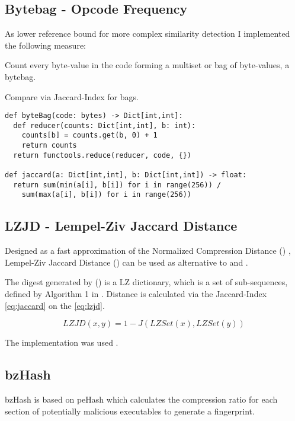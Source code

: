 \documentclass[../main.tex]{subfiles}
\begin{document}
\subsection{Bytebag - Opcode Frequency}
As lower reference bound for more complex similarity detection I implemented the following measure:

\begin{ol}
  \item Count every byte-value in the code forming a multiset or bag of byte-values, a bytebag.
  \item Compare via Jaccard-Index for bags.
\end{ol}

\begin{lstlisting}[style=pymd]
def byteBag(code: bytes) -> Dict[int,int]:
  def reducer(counts: Dict[int,int], b: int):
    counts[b] = counts.get(b, 0) + 1
    return counts
  return functools.reduce(reducer, code, {})

def jaccard(a: Dict[int,int], b: Dict[int,int]) -> float:
  return sum(min(a[i], b[i]) for i in range(256)) /
    sum(max(a[i], b[i]) for i in range(256))
\end{lstlisting}

\subsection{LZJD - Lempel-Ziv Jaccard Distance}
Designed as a fast approximation of the Normalized Compression Distance () \cite{raff2017alternative}, Lempel-Ziv Jaccard Distance () can be used as alternative to  and  \cite{raff2018lempel}.

The digest generated by  () is a LZ dictionary, which is a set of sub-sequences, defined by Algorithm 1 in \cite{raff2017alternative}. Distance is calculated via the Jaccard-Index \eqref{eq:jaccard} on the  \eqref{eq:lzjd}.

\begin{equation}
  LZJD(x,y) = 1 - J(LZSet(x), LZSet(y))
  \label{eq:lzjd}
\end{equation}

The  implementation was used \cite{raff2019pylzjd}.


\subsection{bzHash}
bzHash is based on peHash\cite{wicherski2009pehash} which calculates the compression ratio for each section of potentially malicious executables to generate a fingerprint.
\end{document}
